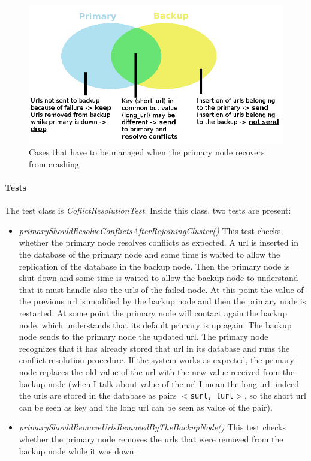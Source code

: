 \documentclass{article}
\begin{document}
\begin{figure}
\centering
\includegraphics[scale=0.45]{sets}
\caption{Cases that have to be managed when the primary node recovers from crashing}
\label{fig:sets}
\end{figure}


\paragraph{Tests} The test class is \textit{CoflictResolutionTest}. Inside this class, two tests are present:
\begin{itemize}
\item \textit{primaryShouldResolveConflictsAfterRejoiningCluster()} This test checks whether the primary node resolves conflicts as expected. A url is inserted in the database of the primary node and some time is waited to allow the replication of the database in the backup node. Then the primary node is shut down and some time is waited to allow the backup node to understand that it must handle also the urls of the failed node. At this point the value of the previous url is modified by the backup node and then the primary node is restarted. At some point the primary node will contact again the backup node, which understands that its default primary is up again. The backup node sends to the primary node the updated url. The primary node recognizes that it has already stored that url in its database and runs the conflict resolution procedure. If the system works as expected, the primary node replaces the old value of the url with the new value received from the backup node (when I talk about value of the url I mean the long url: indeed the urls are stored in the database as pairs \texttt{$<$surl, lurl$>$}, so the short url can be seen as key and the long url can be seen as value of the pair).
\item \textit{primaryShouldRemoveUrlsRemovedByTheBackupNode()} This test checks whether the primary node removes the urls that were removed from the backup node while it was down.
\end{itemize}
\end{document}

